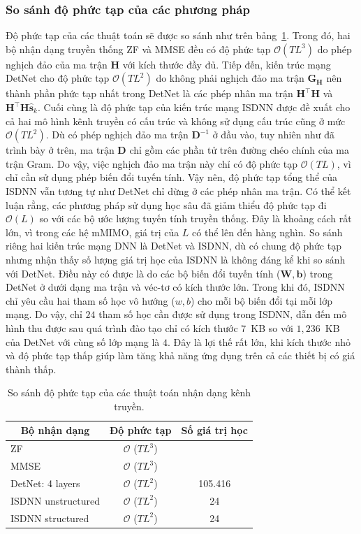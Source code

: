\subsubsection*{\textbf{So sánh độ phức tạp của các phương pháp}}
Độ phức tạp của các thuật toán sẽ được so sánh như trên bảng~\ref{tab:computational}. Trong đó, hai bộ nhận dạng truyền thống ZF và MMSE đều có độ phức tạp $\mathcal{O}(TL^3)$ do phép nghịch đảo của ma trận $\mathbf{H}$ với kích thước đầy đủ. Tiếp đến, kiến trúc mạng DetNet cho độ phức tạp $\mathcal{O}(TL^2)$ do không phải nghịch đảo ma trận $\mathbf{G}_\mathbf{H}$ nên thành phần phức tạp nhất trong DetNet là các phép nhân ma trận $\mathbf{H}^\top \mathbf{H}$ và $\mathbf{H}^\top \mathbf{H} \hat{\mathbf{s}}_k$. Cuối cùng là độ phức tạp của kiến trúc mạng ISDNN được đề xuất cho cả hai mô hình kênh truyền có cấu trúc và không sử dụng cấu trúc cũng ở mức $\mathcal{O}(TL^2)$. Dù có phép nghịch đảo ma trận $\mathbf{D}^{-1}$ ở đầu vào, tuy nhiên như đã trình bày ở trên, ma trận $\mathbf{D}$ chỉ gồm các phần tử trên đường chéo chính của ma trận Gram. Do vậy, việc nghịch đảo ma trận này chỉ có độ phức tạp $\mathcal{O}(TL)$, vì chỉ cần sử dụng phép biến đổi tuyến tính. Vậy nên, độ phức tạp tổng thể của ISDNN vẫn tương tự như DetNet chỉ dừng ở các phép nhân ma trận. Có thể kết luận rằng, các phương pháp sử dụng học sâu đã giảm thiểu độ phức tạp đi $\mathcal{O}(L)$ so với các bộ ước lượng tuyến tính truyền thống. Đây là khoảng cách rất lớn, vì trong các hệ mMIMO, giá trị của $L$ có thể lên đến hàng nghìn. So sánh riêng hai kiến trúc mạng DNN là DetNet và ISDNN, dù có chung độ phức tạp nhưng nhận thấy số lượng giá trị học của ISDNN là không đáng kể khi so sánh với DetNet. Điều này có được là do các bộ biến đổi tuyến tính ($\mathbf{W}, \mathbf{b}$) trong DetNet ở dưới dạng ma trận và véc-tơ có kích thước lớn. Trong khi đó, ISDNN chỉ yêu cầu hai tham số học vô hướng ($w, b$) cho mỗi bộ biến đổi tại mỗi lớp mạng. Do vậy, chỉ $24$ tham số học cần được sử dụng trong ISDNN, dẫn đến mô hình thu được sau quá trình đào tạo chỉ có kích thước $7$~KB so với $1,236$~KB của DetNet với cùng số lớp mạng là $4$. Đây là lợi thế rất lớn, khi kích thước nhỏ và độ phức tạp thấp giúp làm tăng khả năng ứng dụng trên cả các thiết bị có giá thành thấp.
\begin{table}[t]
    \centering
    \caption{So sánh độ phức tạp của các thuật toán nhận dạng kênh truyền.}
    \label{tab:computational}
    \begin{tabular}{l|c|c}
    \hline
    \hline
    \multicolumn{1}{c|}{\textbf{Bộ nhận dạng}} & \textbf{Độ phức tạp} & \textbf{Số giá trị học} \\ \hline
    ZF & $\mathcal{O}$ ($TL^3$) &  \\ \hline
    MMSE & $\mathcal{O}$ ($TL^3$) &  \\ \hline
    DetNet: 4 layers & $\mathcal{O}$ ($TL^2$) & 105.416 \\ \hline
    ISDNN unstructured& $\mathcal{O}$ ($TL^2$) & 24 \\ \hline
    ISDNN structured& $\mathcal{O}$ ($TL^2$) & 24 \\ \hline
    \end{tabular}
\end{table}


